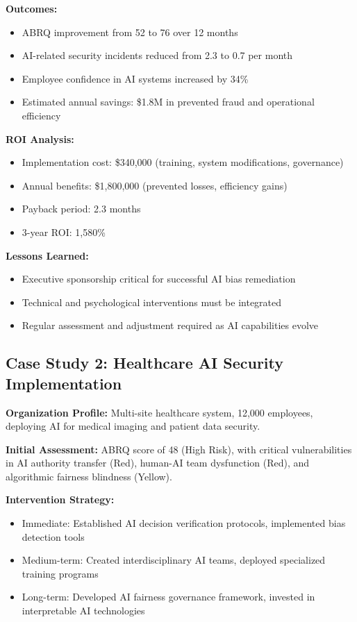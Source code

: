 \documentclass[11pt,a4paper]{article}
\begin{document}
\textbf{Outcomes:}
\begin{itemize}
\item ABRQ improvement from 52 to 76 over 12 months
\item AI-related security incidents reduced from 2.3 to 0.7 per month
\item Employee confidence in AI systems increased by 34\%
\item Estimated annual savings: \$1.8M in prevented fraud and operational efficiency
\end{itemize}

\textbf{ROI Analysis:}
\begin{itemize}
\item Implementation cost: \$340,000 (training, system modifications, governance)
\item Annual benefits: \$1,800,000 (prevented losses, efficiency gains)
\item Payback period: 2.3 months
\item 3-year ROI: 1,580\%
\end{itemize}

\textbf{Lessons Learned:}
\begin{itemize}
\item Executive sponsorship critical for successful AI bias remediation
\item Technical and psychological interventions must be integrated
\item Regular assessment and adjustment required as AI capabilities evolve
\end{itemize}

\subsection{Case Study 2: Healthcare AI Security Implementation}

\textbf{Organization Profile:} Multi-site healthcare system, 12,000 employees, deploying AI for medical imaging and patient data security.

\textbf{Initial Assessment:} ABRQ score of 48 (High Risk), with critical vulnerabilities in AI authority transfer (Red), human-AI team dysfunction (Red), and algorithmic fairness blindness (Yellow).

\textbf{Intervention Strategy:}
\begin{itemize}
\item Immediate: Established AI decision verification protocols, implemented bias detection tools
\item Medium-term: Created interdisciplinary AI teams, deployed specialized training programs
\item Long-term: Developed AI fairness governance framework, invested in interpretable AI technologies
\end{itemize}
\end{document}
